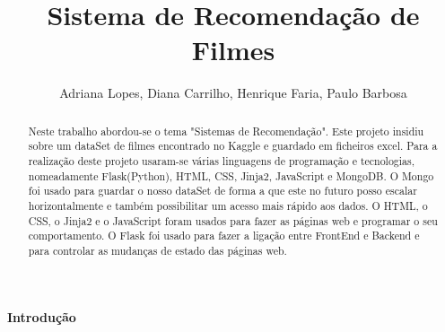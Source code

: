 

\title{Sistema de Recomendação de Filmes}

\author{Adriana Lopes, Diana Carrilho, Henrique Faria, Paulo Barbosa}





\maketitle

\begin{abstract}
Neste trabalho abordou-se o tema "Sistemas de Recomendação". Este projeto insidiu sobre um dataSet de filmes encontrado no Kaggle e guardado em ficheiros excel. Para a realização deste projeto usaram-se várias linguagens de programação e tecnologias, nomeadamente Flask(Python), HTML, CSS, Jinja2, JavaScript e MongoDB. O Mongo foi usado para guardar o nosso dataSet de forma a que este no futuro posso escalar horizontalmente e também possibilitar um acesso mais rápido aos dados. O HTML, o CSS, o Jinja2 e o JavaScript foram usados para fazer as páginas web e programar o seu comportamento. O Flask foi usado para fazer a ligação entre FrontEnd e Backend e para controlar as mudanças de estado das páginas web. 
\newline

\end{abstract}


\begin{center}
\normalsize{\bfseries Introdução}\hfill 
\end{center}

